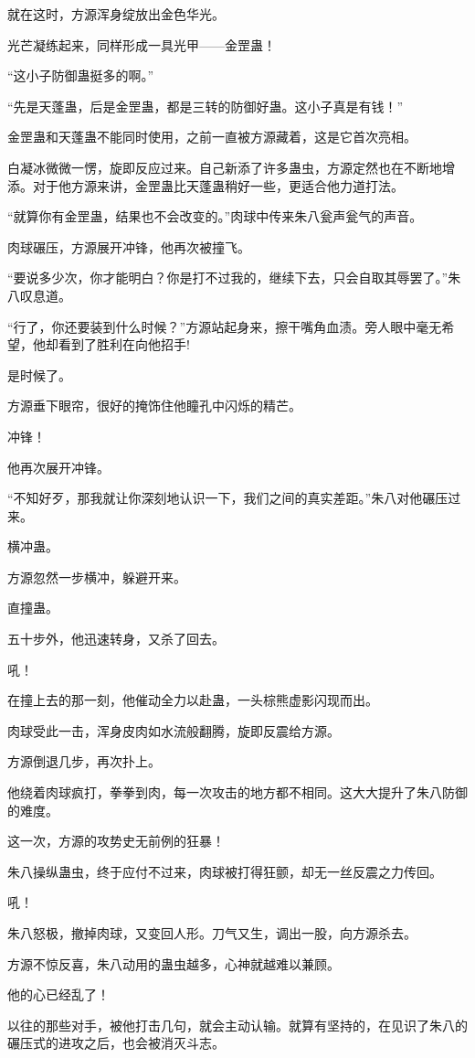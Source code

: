 \begin{this_body}
就在这时，方源浑身绽放出金色华光。

光芒凝练起来，同样形成一具光甲——金罡蛊！

“这小子防御蛊挺多的啊。”

“先是天蓬蛊，后是金罡蛊，都是三转的防御好蛊。这小子真是有钱！”

金罡蛊和天蓬蛊不能同时使用，之前一直被方源藏着，这是它首次亮相。

白凝冰微微一愣，旋即反应过来。自己新添了许多蛊虫，方源定然也在不断地增添。对于他方源来讲，金罡蛊比天蓬蛊稍好一些，更适合他力道打法。

“就算你有金罡蛊，结果也不会改变的。”肉球中传来朱八瓮声瓮气的声音。

肉球碾压，方源展开冲锋，他再次被撞飞。

“要说多少次，你才能明白？你是打不过我的，继续下去，只会自取其辱罢了。”朱八叹息道。

“行了，你还要装到什么时候？”方源站起身来，擦干嘴角血渍。旁人眼中毫无希望，他却看到了胜利在向他招手!

是时候了。

方源垂下眼帘，很好的掩饰住他瞳孔中闪烁的精芒。

冲锋！

他再次展开冲锋。

“不知好歹，那我就让你深刻地认识一下，我们之间的真实差距。”朱八对他碾压过来。

横冲蛊。

方源忽然一步横冲，躲避开来。

直撞蛊。

五十步外，他迅速转身，又杀了回去。

吼！

在撞上去的那一刻，他催动全力以赴蛊，一头棕熊虚影闪现而出。

肉球受此一击，浑身皮肉如水流般翻腾，旋即反震给方源。

方源倒退几步，再次扑上。

他绕着肉球疯打，拳拳到肉，每一次攻击的地方都不相同。这大大提升了朱八防御的难度。

这一次，方源的攻势史无前例的狂暴！

朱八操纵蛊虫，终于应付不过来，肉球被打得狂颤，却无一丝反震之力传回。

吼！

朱八怒极，撤掉肉球，又变回人形。刀气又生，调出一股，向方源杀去。

方源不惊反喜，朱八动用的蛊虫越多，心神就越难以兼顾。

他的心已经乱了！

以往的那些对手，被他打击几句，就会主动认输。就算有坚持的，在见识了朱八的碾压式的进攻之后，也会被消灭斗志。


\end{this_body}
